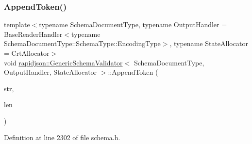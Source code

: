 \subsubsection{\texorpdfstring{AppendToken()}{AppendToken()}}
{\footnotesize\ttfamily template$<$typename Schema\+Document\+Type, typename Output\+Handler = Base\+Reader\+Handler$<$typename Schema\+Document\+Type\+::\+Schema\+Type\+::\+Encoding\+Type$>$, typename State\+Allocator = Crt\+Allocator$>$ \\
void \mbox{\hyperlink{classrapidjson_1_1_generic_schema_validator}{rapidjson\+::\+Generic\+Schema\+Validator}}$<$ Schema\+Document\+Type, Output\+Handler, State\+Allocator $>$\+::Append\+Token (\begin{DoxyParamCaption}\item[{const \mbox{\hyperlink{classrapidjson_1_1_generic_schema_validator_ab5b7093443e29cf66eb7cf47f3d8583d}{Ch}} $\ast$}]{str,  }\item[{\mbox{\hyperlink{namespacerapidjson_a44eb33eaa523e36d466b1ced64b85c84}{Size\+Type}}}]{len }\end{DoxyParamCaption})\hspace{0.3cm}{\ttfamily [private]}}



Definition at line 2302 of file schema.\+h.


